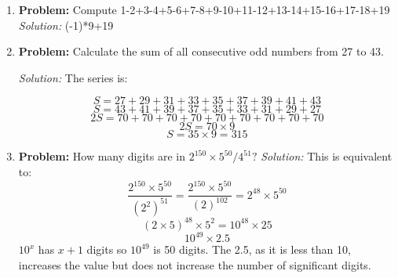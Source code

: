 \documentclass{article}
\begin{document}
\begin{enumerate}
\begin{enumerate}
    \end{enumerate}

    \item \textbf{Problem:} Compute 1-2+3-4+5-6+7-8+9-10+11-12+13-14+15-16+17-18+19
    \textit{Solution:} (-1)*9+19

    \item \textbf{Problem:} Calculate the sum of all consecutive odd numbers from 27 to 43.
    
    \textit{Solution:} The series is:
    
    $$ S = 27 + 29 + 31 + 33 + 35 + 37 + 39 + 41 + 43 $$
    $$ S = 43 + 41 + 39 + 37 + 35 + 33 + 31 + 29 + 27 $$
    $$ 2S = 70 + 70 + 70 + 70 + 70 + 70 + 70 + 70 + 70 $$
    $$ 2S = 70 \times 9$$
    $$ S = 35 \times 9 = 315$$



    \item \textbf{Problem:} How many digits are in $2^{150} \times 5^{50} / 4^{51}?$
    \textit{Solution:} This is equivalent to:
    $$\frac{2^{150} \times 5^{50}}{(2^2)^{51}} = \frac{2^{150} \times 5^{50}}{(2)^{102}} = 2^{48}\times5^{50}$$
    $$ (2\times5)^{48} \times 5^{2} =  10^{48} \times 25$$
    $$10^{49} \times 2.5$$
    $10^{x}$ has $x+1$ digits so $10^{49}$ is 50 digits. The 2.5, as it is less than 10, increases the value but does not increase the number of significant digits.


\end{enumerate}
\end{document}
